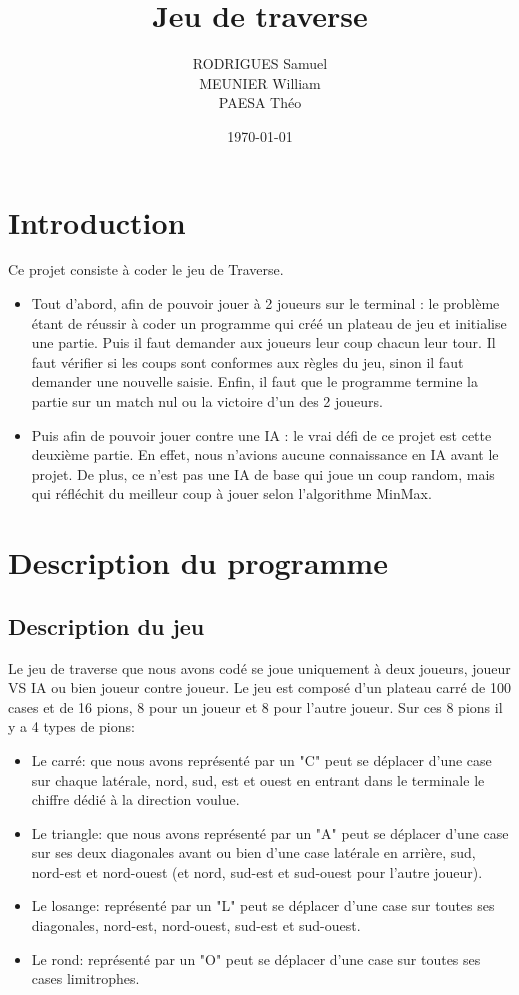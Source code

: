 \documentclass{article}
\author{RODRIGUES Samuel \\ MEUNIER William \\ PAESA Théo}
\title{Jeu de traverse}
\date{\today}
\begin{document}
\makeEistiHdr

\section{Introduction}
Ce projet consiste à coder le jeu de Traverse. 
    \begin{itemize}
        \item Tout d'abord, afin de pouvoir jouer à 2 joueurs sur le terminal :
            le problème étant de réussir à coder un programme qui créé un plateau de jeu et initialise une partie. Puis il faut demander aux joueurs leur coup chacun leur tour. Il faut vérifier si les coups sont conformes aux règles du jeu, sinon il faut demander une nouvelle saisie. Enfin, il faut que le programme termine la partie sur un match nul ou la victoire d'un des 2 joueurs. 
        \item Puis afin de pouvoir jouer contre une IA :
            le vrai défi de ce projet est cette deuxième partie. En effet, nous n'avions aucune connaissance en IA avant le projet. De plus, ce n'est pas une IA de base qui joue un coup random, mais qui réfléchit du meilleur coup à jouer selon l'algorithme MinMax.
    \end{itemize}

\section{Description du programme}
    
    \subsection{Description du jeu}
        Le jeu de traverse que nous avons codé se joue uniquement à deux joueurs, joueur VS IA ou bien joueur contre joueur. Le jeu est composé d'un plateau carré de 100 cases et de 16 pions, 8 pour un joueur et 8 pour l'autre joueur. Sur ces 8 pions il y a 4 types de pions:
        
        \begin{itemize}
        
            \item Le carré: que nous avons représenté par un "C" peut se déplacer d'une case sur chaque latérale, nord, sud, est et ouest en entrant dans le terminale le chiffre dédié à la direction voulue.
            
            \item Le triangle: que nous avons représenté par un "A" peut se déplacer d'une case sur ses deux diagonales avant ou bien d'une case latérale en arrière, sud, nord-est et nord-ouest (et nord, sud-est et sud-ouest pour l'autre joueur).
            
            \item Le losange: représenté par un "L" peut se déplacer d'une case sur toutes ses diagonales, nord-est, nord-ouest, sud-est et sud-ouest.
            
            \item Le rond: représenté par un "O" peut se déplacer d'une case sur toutes ses cases limitrophes.
            
        \end{itemize}
        
\end{document}
